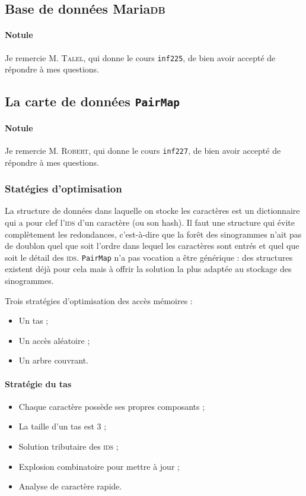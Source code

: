 \subsection{Base de données Maria\textsc{db}}

\paragraph{Notule} Je remercie M. \textsc{Talel}, qui donne le cours \texttt{inf225}, de bien avoir accepté de répondre à mes questions.

\subsection{La carte de données \texttt{PairMap}}

\paragraph{Notule} Je remercie M. \textsc{Robert}, qui donne le cours \texttt{inf227}, de bien avoir accepté de répondre à mes questions.

\subsubsection{Statégies d'optimisation}

La structure de données dans laquelle on stocke les caractères est un dictionnaire qui a pour clef l'\textsc{ids} d'un caractère (ou son hash). Il faut une structure qui évite complètement les redondances, c'est-à-dire que la forêt des sinogrammes n'ait pas de doublon quel que soit l'ordre dans lequel les caractères sont entrés et quel que soit le détail des \textsc{ids}. \texttt{PairMap} n'a pas vocation a être générique : des structures existent déjà pour cela mais à offrir la solution la plus adaptée au stockage des sinogrammes.

Trois stratégies d'optimisation des accès mémoires :
\begin{itemize}
\item Un tas ;
\item Un accès aléatoire ;
\item Un arbre couvrant.
\end{itemize}

\paragraph{Stratégie du tas}
\begin{itemize}
\item Chaque caractère possède ses propres composants ;
\item La taille d'un tas est 3 ;
\item Solution tributaire des \textsc{ids} ;
\item Explosion combinatoire pour mettre à jour ;
\item Analyse de caractère rapide.
\end{itemize}


